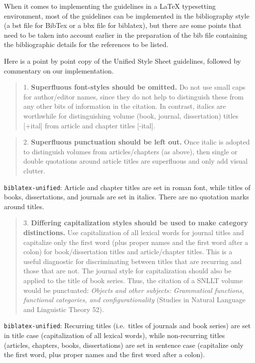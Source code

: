 \documentclass[
]{article}
\begin{document}
When it comes to implementing the guidelines in a LaTeX typesetting
environment, most of the guidelines can be implemented in the
bibliography style (a bst file for BibTex or a bbx file for biblatex),
but there are some points that need to be taken into account earlier in
the preparation of the bib file containing the bibliographic details for
the references to be listed.

Here is a point by point copy of the Unified Style Sheet guidelines,
followed by commentary on our implementation.

\begin{quote}
1. \textbf{Superfluous font-styles should be omitted.} Do not use small
caps for author/editor names, since they do not help to distinguish
these from any other bits of information in the citation. In contrast,
italics are worthwhile for distinguishing volume (book, journal,
dissertation) titles {[}+ital{]} from article and chapter titles
{[}-ital{]}.
\end{quote}

\begin{quote}
2. \textbf{Superfluous punctuation should be left out.} Once italic is
adopted to distinguish volumes from articles/chapters (as above), then
single or double quotations around article titles are superfluous and
only add visual clutter.
\end{quote}

\texttt{biblatex-unified}: Article and chapter titles are set in roman
font, while titles of books, dissertations, and journals are set in
italics. There are no quotation marks around titles.

\begin{quote}
3. \textbf{Differing capitalization styles should be used to make
category distinctions.} Use capitalization of all lexical words for
journal titles and capitalize only the first word (plus proper names and
the first word after a colon) for book/dissertation titles and
article/chapter titles. This is a useful diagnostic for discriminating
between titles that are recurring and those that are not. The journal
style for capitalization should also be applied to the title of book
series. Thus, the citation of a SNLLT volume would be punctuated:
\emph{Objects and other subjects: Grammatical functions, functional
categories, and configurationality} (Studies in Natural Language and
Linguistic Theory 52).
\end{quote}

\texttt{biblatex-unified}: Recurring titles (i.e.~titles of journals and
book series) are set in title case (capitalization of all lexical
words), while non-recurring titles (articles, chapters, books,
dissertations) are set in sentence case (capitalize only the first word,
plus proper names and the first word after a colon).
\end{document}
